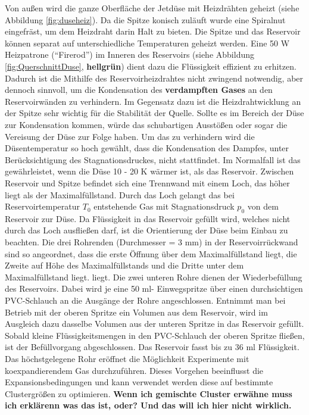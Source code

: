 Von außen wird die ganze Oberfläche der Jetdüse mit Heizdrähten geheizt (siehe Abbildung \ref{fig:duseheiz}). Da die Spitze konisch zuläuft wurde eine Spiralnut eingefräst, um dem Heizdraht darin Halt zu bieten. Die Spitze und das Reservoir können separat auf unterschiedliche Temperaturen geheizt werden. Eine 50 W Heizpatrone (\enquote{Firerod}) im Inneren des Reservoirs (siehe Abbildung \ref{fig:QuerschnittDuse}, \textbf{hellgrün}) dient dazu die Flüssigkeit effizient zu erhitzen. Dadurch ist die Mithilfe des Reservoirheizdrahtes nicht zwingend notwendig, aber dennoch sinnvoll, um die Kondensation des \textbf{verdampften Gases} an den Reservoirwänden zu verhindern. Im Gegensatz dazu ist die Heizdrahtwicklung an der Spitze sehr wichtig für die Stabilität der Quelle. Sollte es im Bereich der Düse zur Kondensation kommen, würde das schubartigen Ausstößen oder sogar die Vereisung der Düse zur Folge haben. Um das zu verhindern wird die Düsentemperatur so hoch gewählt, dass die Kondensation des Dampfes, unter Berücksichtigung des Stagnationsdruckes, nicht stattfindet. Im Normalfall ist das gewährleistet, wenn die Düse 10 - 20 K wärmer ist, als das Reservoir.
Zwischen Reservoir und Spitze befindet sich eine Trennwand mit einem Loch, das höher liegt als der Maximalfüllstand. Durch das Loch gelangt das bei Reservoirtemperatur $T_0$ entstehende Gas mit Stagnationsdruck $p_0$ von dem Reservoir zur Düse. 
Da Flüssigkeit in das Reservoir gefüllt wird, welches nicht durch das Loch ausfließen darf, ist die Orientierung der Düse beim Einbau zu beachten. Die drei Rohrenden (Durchmesser = 3 mm) in der Reservoirrückwand sind so angeordnet, dass die erste Öffnung über dem Maximalfüllstand liegt, die Zweite auf Höhe des Maximalfüllstands und die Dritte unter dem Maximalfüllstand liegt. liegt. Die zwei unteren Rohre dienen der Wiederbefüllung des Reservoirs. Dabei wird je eine 50 ml- Einwegspritze über einen durchsichtigen PVC-Schlauch an die Ausgänge der Rohre angeschlossen. Entnimmt man bei Betrieb mit der oberen Spritze ein Volumen aus dem Reservoir, wird im Ausgleich dazu dasselbe Volumen aus der unteren Spritze in das Reservoir gefüllt. Sobald kleine Flüssigkeitsmengen in den PVC-Schlauch der oberen Spritze fließen, ist der Befüllvorgang abgeschlossen. Das Reservoir fasst bis zu 36 ml Flüssigkeit. 
Das höchstgelegene Rohr eröffnet die Möglichkeit Experimente mit koexpandierendem Gas durchzuführen. Dieses Vorgehen beeinflusst die Expansionsbedingungen und kann verwendet werden diese auf bestimmte Clustergrößen zu optimieren. \textbf{Wenn ich gemischte Cluster erwähne muss ich erklärenn was das ist, oder? Und das will ich hier nicht wirklich.}   
